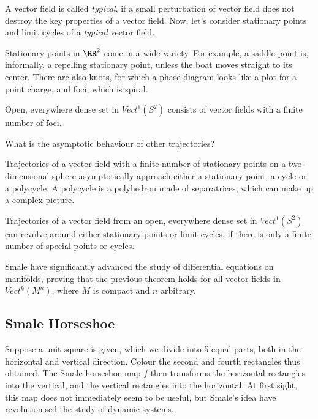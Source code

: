 \documentclass[11pt]{scrartcl}
\begin{document}
  A vector field is called \textit{typical}, if a small perturbation
  of vector field does not destroy the key properties of a vector
  field. Now, let's consider stationary points and limit cycles of a
  \textit{typical} vector field.

  Stationary points in $\RR^{2}$ come in a wide variety. For example,
  a saddle point is, informally, a repelling stationary point, unless
  the boat moves straight to its center. There are also knots, for
  which a phase diagram looks like a plot for a point charge, and
  foci, which is spiral.

  \begin{theorem}
    Open, everywhere dense set in $Vect^{1}(S^{2})$ consists of vector
    fields with a finite number of foci.
  \end{theorem}

  What is the asymptotic behaviour of other trajectories?

  Trajectories of a vector field with a finite number of stationary
  points on a two-dimensional sphere asymptotically approach either a
  stationary point, a cycle or a polycycle. A polycycle is a
  polyhedron made of separatrices, which can make up a complex
  picture.

  \begin{theorem}
    Trajectories of a vector field from an open, everywhere dense set
    in $Vect^{1}(S^{2})$ can revolve around either stationary points
    or limit cycles, if there is only a finite number of special
    points or cycles.
  \end{theorem}

  Smale have significantly advanced the study of differential
  equations on manifolds, proving that the previous theorem holds for
  all vector fields in $Vect^{k}(M^{n})$, where $M$ is compact and $n$
  arbitrary.

  \subsection{Smale Horseshoe}

  Suppose a unit square is given, which we divide into 5 equal parts,
  both in the horizontal and vertical direction. Colour the second and
  fourth rectangles thus obtained. The Smale horseshoe map $f$ then
  transforms the horizontal rectangles into the vertical, and the
  vertical rectangles into the horizontal. At first sight, this map
  does not immediately seem to be useful, but Smale's idea have
  revolutionised the study of dynamic systems.
\end{document}
